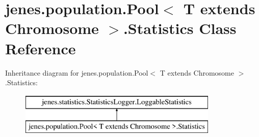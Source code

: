 \hypertarget{classjenes_1_1population_1_1_pool_3_01_t_01extends_01_chromosome_01_4_1_1_statistics}{\section{jenes.\-population.\-Pool$<$ T extends Chromosome $>$.Statistics Class Reference}
\label{classjenes_1_1population_1_1_pool_3_01_t_01extends_01_chromosome_01_4_1_1_statistics}
}
Inheritance diagram for jenes.\-population.\-Pool$<$ T extends Chromosome $>$.Statistics\-:\begin{figure}[H]
\begin{center}
\leavevmode
\includegraphics[height=2.000000cm]{classjenes_1_1population_1_1_pool_3_01_t_01extends_01_chromosome_01_4_1_1_statistics}
\end{center}
\end{figure}
